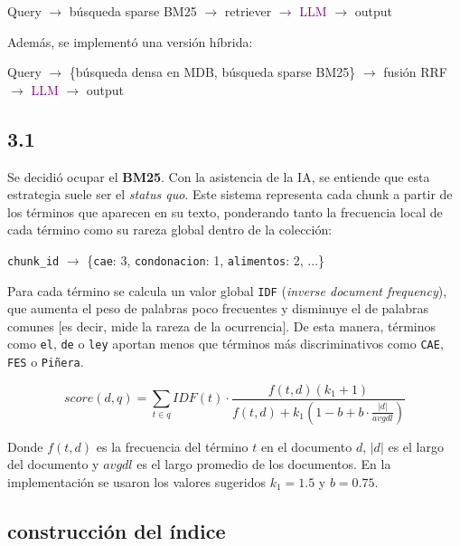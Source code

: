 \documentclass{article}
\begin{document}
\begin{mdframed}[style=simplebox]
Query $\rightarrow$ búsqueda sparse BM25 $\rightarrow$ retriever $\rightarrow$ \textcolor{purple}{LLM} $\rightarrow$ output
\end{mdframed}

Además, se implementó una versión híbrida:

\begin{mdframed}[style=simplebox]
Query $\rightarrow$ \{búsqueda densa en MDB, búsqueda sparse BM25\} $\rightarrow$ fusión RRF $\rightarrow$ \textcolor{purple}{LLM} $\rightarrow$ output
\end{mdframed}

\subsection*{3.1}

Se decidió ocupar el \textbf{BM25}. Con la asistencia de la IA, se entiende que esta estrategia suele ser el \textit{status quo}. Este sistema representa cada chunk a partir de los términos que aparecen en su texto, ponderando tanto la frecuencia local de cada término como su rareza global dentro de la colección: 

\begin{mdframed}
\texttt{chunk\_id} $\rightarrow$ \{\texttt{cae}: 3, \texttt{condonacion}: 1, \texttt{alimentos}: 2, ...\}
\end{mdframed}

Para cada término se calcula un valor global \texttt{IDF} (\textit{inverse document frequency}), que aumenta el peso de palabras poco frecuentes y disminuye el de palabras comunes [es decir, mide la rareza de la ocurrencia]. De esta manera, términos como \texttt{el}, \texttt{de} o \texttt{ley} aportan menos que términos más discriminativos como \texttt{CAE}, \texttt{FES} o \texttt{Piñera}.

\begin{equation*}
score(d, q) = \sum_{t \in q} IDF(t) \cdot
\frac{f(t,d)(k_1 + 1)}
{f(t,d) + k_1(1 - b + b \cdot \frac{|d|}{avgdl})}
\end{equation*}

Donde $f(t,d)$ es la frecuencia del término $t$ en el documento $d$, $|d|$ es el largo del documento y $avgdl$ es el largo promedio de los documentos. En la implementación se usaron los valores sugeridos $k_1 = 1.5$ y $b = 0.75$.

\subsection*{construcción del índice}
\end{document}
